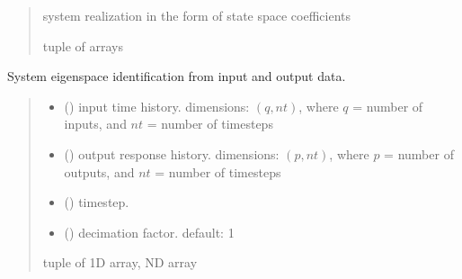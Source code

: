\documentclass[letterpaper,10pt,english]{sphinxmanual}
\begin{document}
\begin{fulllineitems}
\begin{quote}
\begin{description}
\begin{itemize}
\end{itemize}

\sphinxAtStartPar
system realization in the form of state space coefficients 

\sphinxAtStartPar
tuple of arrays

\end{description}\end{quote}

\end{fulllineitems}


\begin{fulllineitems}
\label{\detokenize{library/index:mdof.eigid}}
\pysigstartsignatures
{}
\pysigstopsignatures
\sphinxAtStartPar
System eigenspace identification from input and output data.
\begin{quote}\begin{description}
\begin{itemize}
\item {} 
\sphinxAtStartPar
{} () \textendash{} input time history. dimensions: \((q,nt)\), where
\(q\) = number of inputs, and \(nt\) = number of timesteps

\item {} 
\sphinxAtStartPar
{} () \textendash{} output response history.
dimensions: \((p,nt)\), where \(p\) = number of outputs, and
\(nt\) = number of timesteps

\item {} 
\sphinxAtStartPar
{} () \textendash{} timestep.

\item {} 
\sphinxAtStartPar
{} (\sphinxstyleliteralemphasis{\sphinxupquote{, }}) \textendash{} decimation factor. default: 1

\end{itemize}

\sphinxAtStartPar
{}

\sphinxAtStartPar
tuple of 1D array, ND array

\end{description}\end{quote}

\end{fulllineitems}
\end{document}
